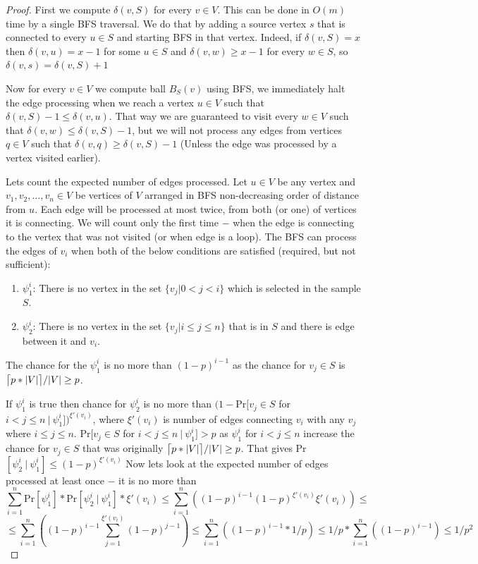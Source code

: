 \documentclass[shortabstract, lic, english]{iithesis}
\theoremstyle{definition} \newtheorem{definition}{Definition}[chapter]
\theoremstyle{remark} \newtheorem{remark}[definition]{Observation}
\theoremstyle{plain} \newtheorem{theorem}[definition]{Theorem}
\theoremstyle{plain} \newtheorem{lemma}[definition]{Lemma}
\theoremstyle{plain} \newtheorem{conjecture}[definition]{Conjecture}
\DeclarePairedDelimiter{\ceil}{\lceil}{\rceil}
\begin{document}
\begin{proof}
    First we compute $\delta(v, S)$ for every $v \in V$. This can be done in $O(m)$ time by a single BFS traversal.
    We do that by adding a source vertex $s$ that is connected to every $u \in S$ and starting BFS in that vertex.
    Indeed, if $\delta(v, S) = x$ then $\delta(v, u) = x - 1$ for some $u \in S$ and $\delta(v, w) \geq x - 1$ for every $w \in S$, so
    $\delta(v, s) = \delta(v, S) + 1$

    Now for every $v \in V$ we compute ball $B_{S}(v)$ using BFS, we immediately halt the edge processing when we reach a vertex $u \in V$ such that $\delta(v,S) - 1 \leq \delta(v, u)$.
    That way we are guaranteed to visit every $w \in V$ such that $\delta(v, w) \leq \delta(v, S) - 1$, but
    we will not process any edges from vertices $q \in V$ such that $\delta(v, q) \geq \delta(v, S) - 1$ (Unless the edge was processed by a vertex visited earlier).

    Lets count the expected number of edges processed. Let $u \in V$ be any vertex and
    $v_1, v_2, \ldots, v_n \in V$ be vertices of $V$ arranged in BFS non-decreasing order of distance from $u$.
    Each edge will be processed at most twice, from both (or one) of vertices it is connecting. We will count only the first time $-$ when the edge is connecting to the vertex that was not visited (or when edge is a loop).
    The BFS can process the edges of $v_i$ when both of the below conditions are satisfied (required, but not sufficient):
    \begin{enumerate}
        \item $\psi_1^i$: There is no vertex in the set $\{v_j |0 < j < i\}$ which is selected in the sample $S$.
        \item $\psi_2^i$: There is no vertex in the set $\{v_j |i \leq j \leq n\}$ that is in $S$ and there is edge between it and $v_i$.
    \end{enumerate} 
    The chance for the $\psi_1^i$ is no more than $(1-p)^{i-1}$ as the chance for $v_j \in S$ is $\ceil[\big]{p * |V|}/|V| \geq p$.
    
    If $\psi_1^i$ is true then chance for $\psi_2^i$ is no more than
    \newline
    $(1 - $Pr$[v_j \in S $ for $i < j \leq n ~|~ \psi_1^i])^{\xi'(v_i)}$, where $\xi'(v_i)$ is number of edges connecting $v_i$ with any $v_j$ where $i \leq j \leq n$.
    \newline
    Pr$[v_j \in S $ for $i < j \leq n ~|~ \psi_1^i] > p$ as $\psi_1^i$ for $i < j \leq n$ increase the chance for $v_j \in S$ that was originally $\ceil[\big]{p * |V|}/|V| \geq p$.
    That gives Pr$[\psi_2^i ~|~ \psi_1^i] \leq (1-p)^{\xi'(v_i)}$
    \newline
    Now lets look at the expected number of edges processed at least once $-$ it is no more than
    $$\sum_{i=1}^{n} \text{Pr}[\psi_1^i] * \text{Pr}[\psi_2^i ~|~ \psi_1^i] * \xi'(v_i) \leq \sum_{i=1}^{n} ((1-p)^{i-1} (1-p)^{\xi'(v_i)}\xi'(v_i)) \leq$$
    $$\leq \sum_{i=1}^{n} ((1-p)^{i-1} \sum_{j=1}^{\xi'(v_i)}(1-p)^{j-1}) \leq 
    \sum_{i=1}^{n} ((1-p)^{i-1} * 1/p) \leq 1/p * \sum_{i=1}^{n} ((1-p)^{i-1}) \leq 1/p^2$$

\end{proof}
\end{document}
